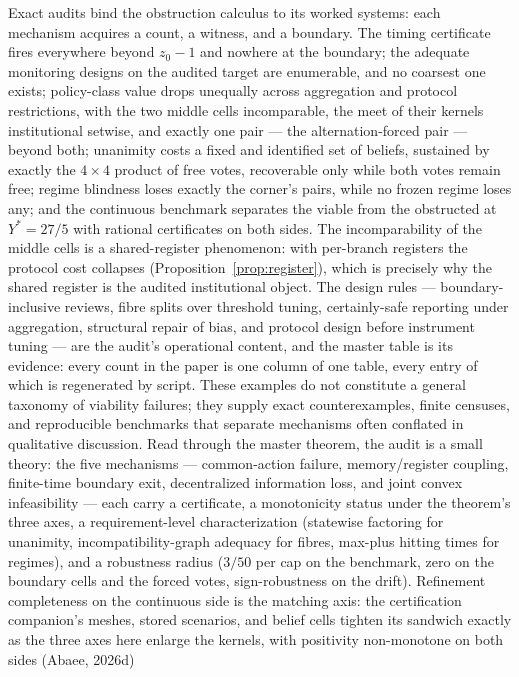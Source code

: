 \documentclass[10pt,twocolumn]{article}
\theoremstyle{definition}
\begin{document}
Exact audits bind the obstruction calculus to its worked systems: each
mechanism acquires a count, a witness, and a boundary. The timing
certificate fires everywhere beyond \(z_0 - 1\) and nowhere at the
boundary; the adequate monitoring designs on the audited target are
enumerable, and no coarsest one exists; policy-class value drops
unequally across aggregation and protocol restrictions, with the two
middle cells incomparable, the meet of their kernels institutional
setwise, and exactly one pair --- the alternation-forced pair --- beyond
both; unanimity costs a fixed and identified set of beliefs, sustained
by exactly the \(4 \times 4\) product of free votes, recoverable only
while both votes remain free; regime blindness loses exactly the
corner's pairs, while no frozen regime loses any; and the continuous
benchmark separates the viable from
the obstructed at \(Y^{*} = 27/5\) with rational certificates on both
sides. The incomparability of the middle cells is a shared-register
phenomenon: with per-branch registers the protocol cost collapses
(Proposition~\ref{prop:register}), which is precisely why the shared
register is the audited institutional object. The design rules --- boundary-inclusive reviews, fibre splits
over threshold tuning, certainly-safe reporting under aggregation,
structural repair of bias, and protocol design before instrument tuning
--- are the audit's operational content, and the master table is its
evidence: every count in the paper is one column of one table, every entry of which is regenerated by script. These examples do not constitute a general taxonomy of viability failures; they supply exact counterexamples, finite censuses, and reproducible benchmarks that separate mechanisms often conflated in qualitative discussion. Read through the master theorem, the audit is a small theory: the five mechanisms --- common-action failure, memory/register coupling, finite-time boundary exit, decentralized information loss, and joint convex infeasibility --- each carry a certificate, a monotonicity status under the theorem's three axes, a requirement-level characterization (statewise factoring for unanimity, incompatibility-graph adequacy for fibres, max-plus hitting times for regimes), and a robustness radius (\(3/50\) per cap on the benchmark, zero on the boundary cells and the forced votes, sign-robustness on the drift). Refinement completeness on the continuous side is the matching axis: the certification companion's meshes, stored scenarios, and belief cells tighten its sandwich exactly as the three axes here enlarge the kernels, with positivity non-monotone on both sides (Abaee, 2026d)
\end{document}
